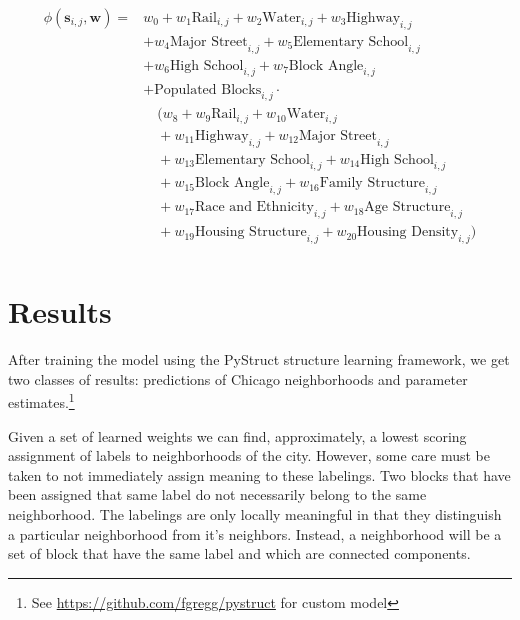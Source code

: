 \documentclass[12pt,letter]{article}\usepackage[]{graphicx}\usepackage[]{color}
\begin{document}
\begin{align}
\phi(\mathbf{s}_{i,j}, \mathbf{w}) =  & w_0 
                                     + w_1\text{Rail}_{i,j} 
                                     + w_2\text{Water}_{i,j} 
                                     + w_3\text{Highway}_{i,j} \\
                                     &+ w_4\text{Major Street}_{i,j} 
                                     + w_5\text{Elementary School}_{i,j}\\ 
                                     & + w_6\text{High School}_{i,j}
                                     + w_7\text{Block Angle}_{i,j} \\
                                     &+ \text{Populated Blocks}_{i,j}\cdot\\
                                     &\quad (w_8
                                     + w_{9}\text{Rail}_{i,j} 
                                     + w_{10}\text{Water}_{i,j}\\ 
                                     &\quad+ w_{11}\text{Highway}_{i,j}
                                     + w_{12}\text{Major Street}_{i,j}\\ 
                                     &\quad + w_{13}\text{Elementary School}_{i,j} 
                                     + w_{14}\text{High School}_{i,j}\\ 
                                     &\quad + w_{15}\text{Block Angle}_{i,j}
                                     + w_{16}\text{Family Structure}_{i,j}\\
                                     &\quad + w_{17}\text{Race and Ethnicity}_{i,j}
                                     + w_{18}\text{Age Structure}_{i,j}\\  
                                     &\quad+ w_{19}\text{Housing Structure}_{i,j}
                                     + w_{20}\text{Housing Density}_{i,j})\\
\end{align}


\section*{Results}
After training the model using the PyStruct structure learning
framework,\cite{mueller_pystruct:_????} we get two classes of results:
predictions of Chicago neighborhoods and parameter
estimates.\footnote{See \url{https://github.com/fgregg/pystruct} for
  custom model}

Given a set of learned weights we can find, approximately, a lowest
scoring assignment of labels to neighborhoods of the city. However,
some care must be taken to not immediately assign meaning to these
labelings. Two blocks that have been assigned that same label do not
necessarily belong to the same neighborhood. The labelings are only
locally meaningful in that they distinguish a particular neighborhood
from it’s neighbors. Instead, a neighborhood will be a set of block
that have the same label and which are connected components.  
\end{document}
